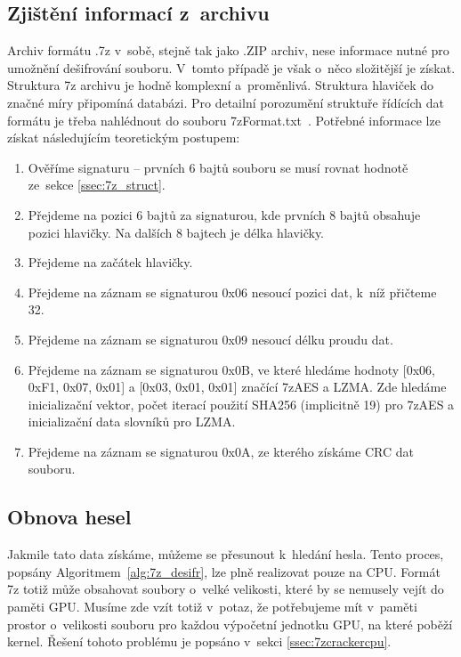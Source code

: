\subsection{Zjištění informací z~archivu}
Archiv formátu .7z v~sobě, stejně tak jako .ZIP archiv, nese informace nutné pro umožnění
dešifrování souboru. V~tomto případě je však o~něco složitější je získat. Struktura 7z archivu
je hodně komplexní a~proměnlivá. Struktura hlaviček do značné míry připomíná databázi. Pro
detailní porozumění struktuře řídících dat formátu je třeba nahlédnout do souboru
7zFormat.txt~\cite{Pavlov:2010}. Potřebné informace lze získat následujícím 
teoretickým postupem:
\begin{enumerate}
    \item Ověříme signaturu -- prvních 6 bajtů souboru se musí rovnat hodnotě ze~sekce \ref{ssec:7z_struct}. 
    \item Přejdeme na pozici 6 bajtů za signaturou, kde	prvních 8 bajtů obsahuje pozici hlavičky.
	Na dalších 8 bajtech je délka hlavičky.
    \item Přejdeme na začátek hlavičky.
    \item Přejdeme na záznam se signaturou 0x06 nesoucí pozici dat, k~níž přičteme 32.
    \item Přejdeme na záznam se signaturou 0x09 nesoucí délku proudu dat.
    \item Přejdeme na záznam se signaturou 0x0B, ve které hledáme hodnoty [0x06, 0xF1, 0x07, 0x01]
	a [0x03, 0x01, 0x01] značící 7zAES a LZMA. Zde hledáme inicializační vektor, počet iterací použití SHA256 (implicitně
	19) pro 7zAES a inicializační data slovníků pro LZMA.
    \item Přejdeme na záznam se signaturou 0x0A, ze kterého získáme CRC dat souboru.
\end{enumerate}

\subsection{Obnova hesel}
Jakmile tato data získáme, můžeme se přesunout k~hledání hesla. Tento proces, popsány
Algoritmem~\ref{alg:7z_desifr}, lze plně realizovat pouze na CPU. Formát 7z totiž může obsahovat
soubory o~velké velikosti, které by se nemusely vejít do paměti GPU. Musíme zde vzít totiž
v~potaz, že potřebujeme mít v~paměti prostor o~velikosti souboru pro každou výpočetní jednotku GPU,
na které poběží kernel. Řešení tohoto problému je popsáno v~sekci \ref{ssec:7zcrackercpu}.

